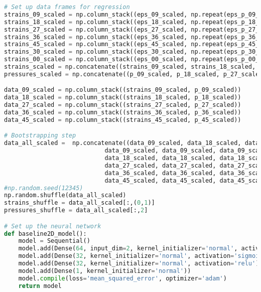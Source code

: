 \begin{lstlisting}[language=Python]
# Set up data frames for regression
strains_09_scaled = np.column_stack((eps_09_scaled, np.repeat(eps_p_09_scaled, eps_09_scaled.shape[0])))
strains_18_scaled = np.column_stack((eps_18_scaled, np.repeat(eps_p_18_scaled, eps_18_scaled.shape[0])))
strains_27_scaled = np.column_stack((eps_27_scaled, np.repeat(eps_p_27_scaled, eps_27_scaled.shape[0])))
strains_36_scaled = np.column_stack((eps_36_scaled, np.repeat(eps_p_36_scaled, eps_36_scaled.shape[0])))
strains_45_scaled = np.column_stack((eps_45_scaled, np.repeat(eps_p_45_scaled, eps_45_scaled.shape[0])))
strains_30_scaled = np.column_stack((eps_30_scaled, np.repeat(eps_p_30_scaled, eps_30_scaled.shape[0])))
strains_00_scaled = np.column_stack((eps_00_scaled, np.repeat(eps_p_00_scaled, eps_00_scaled.shape[0])))
strains_scaled = np.concatenate((strains_09_scaled, strains_18_scaled, strains_27_scaled, strains_36_scaled, strains_45_scaled), axis=0)
pressures_scaled = np.concatenate((p_09_scaled, p_18_scaled, p_27_scaled, p_36_scaled, p_45_scaled), axis=0)

data_09_scaled = np.column_stack((strains_09_scaled, p_09_scaled))
data_18_scaled = np.column_stack((strains_18_scaled, p_18_scaled))
data_27_scaled = np.column_stack((strains_27_scaled, p_27_scaled))
data_36_scaled = np.column_stack((strains_36_scaled, p_36_scaled))
data_45_scaled = np.column_stack((strains_45_scaled, p_45_scaled))

# Bootstrapping step
data_all_scaled =  np.concatenate((data_09_scaled, data_18_scaled, data_27_scaled, data_36_scaled, data_45_scaled, 
                            data_09_scaled, data_09_scaled, data_09_scaled, data_09_scaled,
                            data_18_scaled, data_18_scaled, data_18_scaled, data_18_scaled,
                            data_27_scaled, data_27_scaled, data_27_scaled, data_27_scaled,
                            data_36_scaled, data_36_scaled, data_36_scaled, data_36_scaled,
                            data_45_scaled, data_45_scaled, data_45_scaled, data_45_scaled), axis=0)    
#np.random.seed(12345)
np.random.shuffle(data_all_scaled)
strains_shuffle = data_all_scaled[:,(0,1)]
pressures_shuffle = data_all_scaled[:,2]

# Set up the neural network
def baseline2D_model():
    model = Sequential()
    model.add(Dense(64, input_dim=2, kernel_initializer='normal', activation='sigmoid'))
    model.add(Dense(32, kernel_initializer='normal', activation='sigmoid'))
    model.add(Dense(32, kernel_initializer='normal', activation='relu'))
    model.add(Dense(1, kernel_initializer='normal'))
    model.compile(loss='mean_squared_error', optimizer='adam')
    return model


\end{lstlisting}
